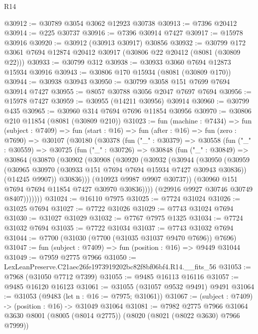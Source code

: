 \begin{lexlean}{R14}
\begin{coremodule}
@30912 := @30789 @3054 @3062 @12923 @30738
@30913 := @7396 @20412
@30914 := @225 @30737
@30916 := @7396 @30914 @7427
@30917 := @15978 @30916
@30920 := @30912 (@30913 @30917) @30856
@30932 := @30799 @172 @3061 @7694 @12874 @20412 @30917 (@30806 @22 @20412 (@8081 (@30809 @22)))
@30933 := @30799 @312
@30938 := @30933 @3060 @7694 @12873 @15934 @30916
@30943 := @30806 @170 @15934 (@8081 (@30809 @170))
@30944 := @30938 @30943
@30950 := @30799 @3058 @151 @7699 @7694 @30914 @7427
@30955 := @8057 @30788 @3056 @2047 @7697 @7694
@30956 := @15978 @7427
@30959 := @30955 (@14211 @30956) @30914
@30960 := @30799 @435
@30965 := @30960 @314 @7694 @7696 @11854 @30956
@30970 := @30806 @210 @11854 (@8081 (@30809 @210))
@31023 := fun (machine : @7434) =>
  fun (subject : @7409) =>
  fun (start : @16) =>
  fun (after : @16) =>
  fun (zero : @7690) =>
  @30107
    (@30180
      (@30378
        (fun ("_" : @30379) =>
        @30558
          (fun ("_" : @30559) =>
          @30725
            (fun ("_" : @30726) =>
            @30848
              (fun ("_" : @30849) =>
              @30864
                (@30870
                  (@30902
                    (@30908
                      (@30920
                        (@30932
                          (@30944
                            (@30950
                              (@30959
                                (@30965 @30970 (@30933 @151 @7694 @7694 @15934 @7427 @30943 @30836))
                                (@14245 @9907))
                              @30836)))
                        (@10923 @9987 @9907 @30737))
                      (@30960 @151 @7694 @7694 @11854 @7427 @30970 @30836))))
                (@29916 @9927 @30746 @30749 @8407)))))))
@31024 := @16110 @7975
@31025 := @7724 @31024
@31026 := @31025 @7694
@31027 := @7722 @31026
@31029 := @7743 @31024 @7694
@31030 := @31027 @31029
@31032 := @7767 @7975 @1325
@31034 := @7724 @31032 @7694
@31035 := @7722 @31034
@31037 := @7743 @31032 @7694
@31044 := @7700 (@31030 (@7700 (@31035 @31037 @9470 @7696)) @7696)
@31047 := fun (subject : @7409) => fun (position : @16) => @9449 @31044
@31049 := @7959 @2775 @7966
@31050 := LexLeanPreserve.C21aec26fe1973919202bc82f8bf06bf4.R14.__fits_56
@31053 := @7968 (@31050 @7712 @7399)
@31055 := @9485 @16113 @16116
@31057 := @9485 @16120 @16123
@31061 := @31055 (@31057 @9532 @9491) @9491
@31064 := @31053 (@9483 (let n : @16 := @7975; @31061))
@31067 := (subject : @7409) -> (position : @16) -> @31049 @31064
@31081 := @7982
    @2775
    @7966
    @31064
    @3630
    @8001
    (@8005 (@8014 @2775))
    (@8020 (@8021 (@8022 @3630) @7966 @7999))

\end{coremodule}
\end{lexlean}
